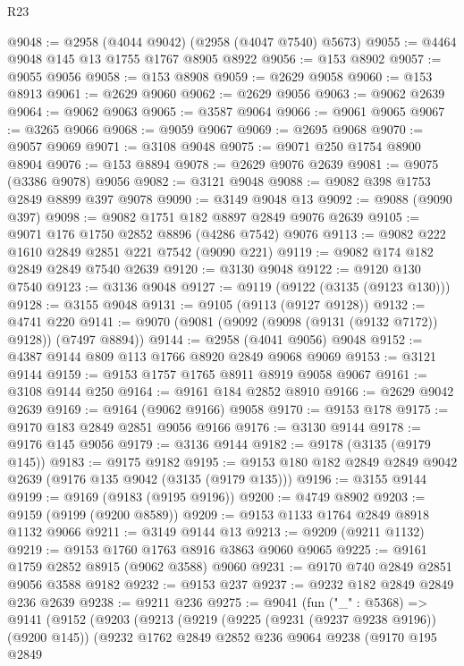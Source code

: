 \begin{lexlean}{R23}
\begin{coremodule}
@9048 := @2958 (@4044 @9042) (@2958 (@4047 @7540) @5673)
@9055 := @4464 @9048 @145 @13 @1755 @1767 @8905 @8922
@9056 := @153 @8902
@9057 := @9055 @9056
@9058 := @153 @8908
@9059 := @2629 @9058
@9060 := @153 @8913
@9061 := @2629 @9060
@9062 := @2629 @9056
@9063 := @9062 @2639
@9064 := @9062 @9063
@9065 := @3587 @9064
@9066 := @9061 @9065
@9067 := @3265 @9066
@9068 := @9059 @9067
@9069 := @2695 @9068
@9070 := @9057 @9069
@9071 := @3108 @9048
@9075 := @9071 @250 @1754 @8900 @8904
@9076 := @153 @8894
@9078 := @2629 @9076 @2639
@9081 := @9075 (@3386 @9078) @9056
@9082 := @3121 @9048
@9088 := @9082 @398 @1753 @2849 @8899 @397 @9078
@9090 := @3149 @9048 @13
@9092 := @9088 (@9090 @397)
@9098 := @9082 @1751 @182 @8897 @2849 @9076 @2639
@9105 := @9071 @176 @1750 @2852 @8896 (@4286 @7542) @9076
@9113 := @9082 @222 @1610 @2849 @2851 @221 @7542 (@9090 @221)
@9119 := @9082 @174 @182 @2849 @2849 @7540 @2639
@9120 := @3130 @9048
@9122 := @9120 @130 @7540
@9123 := @3136 @9048
@9127 := @9119 (@9122 (@3135 (@9123 @130)))
@9128 := @3155 @9048
@9131 := @9105 (@9113 (@9127 @9128))
@9132 := @4741 @220
@9141 := @9070 (@9081 (@9092 (@9098 (@9131 (@9132 @7172)) @9128)) (@7497 @8894))
@9144 := @2958 (@4041 @9056) @9048
@9152 := @4387 @9144 @809 @113 @1766 @8920 @2849 @9068 @9069
@9153 := @3121 @9144
@9159 := @9153 @1757 @1765 @8911 @8919 @9058 @9067
@9161 := @3108 @9144 @250
@9164 := @9161 @184 @2852 @8910
@9166 := @2629 @9042 @2639
@9169 := @9164 (@9062 @9166) @9058
@9170 := @9153 @178
@9175 := @9170 @183 @2849 @2851 @9056 @9166
@9176 := @3130 @9144
@9178 := @9176 @145 @9056
@9179 := @3136 @9144
@9182 := @9178 (@3135 (@9179 @145))
@9183 := @9175 @9182
@9195 := @9153 @180 @182 @2849 @2849 @9042 @2639 (@9176 @135 @9042 (@3135 (@9179 @135)))
@9196 := @3155 @9144
@9199 := @9169 (@9183 (@9195 @9196))
@9200 := @4749 @8902
@9203 := @9159 (@9199 (@9200 @8589))
@9209 := @9153 @1133 @1764 @2849 @8918 @1132 @9066
@9211 := @3149 @9144 @13
@9213 := @9209 (@9211 @1132)
@9219 := @9153 @1760 @1763 @8916 @3863 @9060 @9065
@9225 := @9161 @1759 @2852 @8915 (@9062 @3588) @9060
@9231 := @9170 @740 @2849 @2851 @9056 @3588 @9182
@9232 := @9153 @237
@9237 := @9232 @182 @2849 @2849 @236 @2639
@9238 := @9211 @236
@9275 := @9041
    (fun ("_" : @5368) =>
    @9141
      (@9152
        (@9203
          (@9213
            (@9219
              (@9225 (@9231 (@9237 @9238 @9196)) (@9200 @145))
              (@9232
                @1762
                @2849
                @2852
                @236
                @9064
                @9238
                (@9170
                  @195
                  @2849

\end{coremodule}
\end{lexlean}

